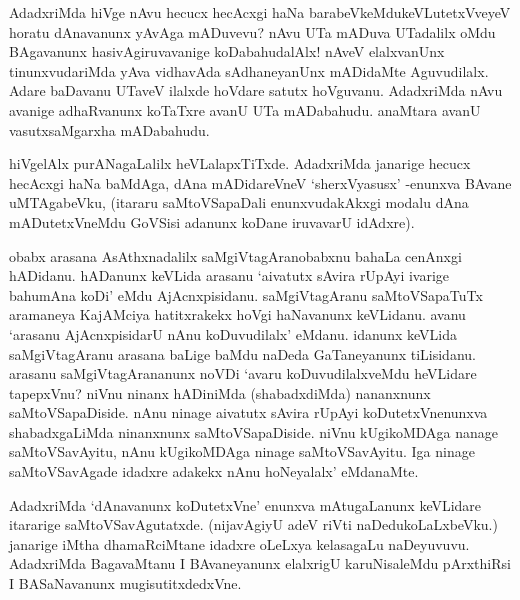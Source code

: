 AdadxriMda hiVge nAvu hecucx hecAcxgi haNa barabeVkeMdukeVLutetxVveyeV horatu dAnavanunx yAvAga mADuvevu? nAvu UTa mADuva UTadalilx oMdu BAgavanunx hasivAgiruvavanige koDabahudalAlx! nAveV elalxvanUnx tinunxvudariMda yAva vidhavAda sAdhaneyanUnx mADidaMte Aguvudilalx. Adare baDavanu UTaveV ilalxde hoVdare satutx hoVguvanu. AdadxriMda nAvu avanige adhaRvanunx koTaTxre avanU UTa mADabahudu. anaMtara avanU vasutxsaMgarxha mADabahudu.

hiVgelAlx purANagaLalilx heVLalapxTiTxde. AdadxriMda janarige hecucx hecAcxgi haNa baMdAga, dAna mADidareVneV `sherxVyasusx' -enunxva BAvane uMTAgabeVku, (itararu saMtoVSapaDali enunxvudakAkxgi modalu dAna mADutetxVneMdu GoVSisi adanunx koDane iruvavarU idAdxre).

obabx arasana AsAthxnadalilx saMgiVtagAranobabxnu bahaLa cenAnxgi hADidanu. hADanunx keVLida arasanu `aivatutx sAvira rUpAyi ivarige bahumAna koDi' eMdu AjAcnxpisidanu. saMgiVtagAranu saMtoVSapaTuTx aramaneya KajAMciya hatitxrakekx hoVgi haNavanunx keVLidanu. avanu `arasanu AjAcnxpisidarU nAnu koDuvudilalx' eMdanu. idanunx keVLida saMgiVtagAranu arasana baLige baMdu naDeda GaTaneyanunx tiLisidanu. arasanu saMgiVtagArananunx noVDi `avaru koDuvudilalxveMdu heVLidare tapepxVnu? niVnu ninanx hADiniMda (shabadxdiMda) nananxnunx saMtoVSapaDiside. nAnu ninage aivatutx sAvira rUpAyi koDutetxVnenunxva shabadxgaLiMda ninanxnunx saMtoVSapaDiside. niVnu kUgikoMDAga nanage saMtoVSavAyitu, nAnu kUgikoMDAga ninage saMtoVSavAyitu. Iga ninage saMtoVSavAgade idadxre adakekx nAnu hoNeyalalx' eMdanaMte.

AdadxriMda `dAnavanunx koDutetxVne' enunxva mAtugaLanunx keVLidare itararige saMtoVSavAgutatxde.‌ (nijavAgiyU adeV riVti naDedukoLaLxbeVku.) janarige iMtha dhamaRciMtane idadxre oLeLxya kelasagaLu naDeyuvuvu. AdadxriMda BagavaMtanu I BAvaneyanunx elalxrigU karuNisaleMdu pArxthiRsi I BASaNavanunx mugisutitxdedxVne.


\endchapter
